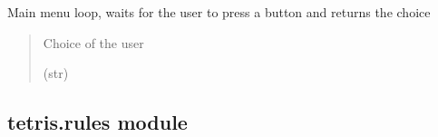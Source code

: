 \documentclass[letterpaper,10pt,english]{sphinxmanual}
\begin{document}
\begin{fulllineitems}
\begin{fulllineitems}
\end{fulllineitems}


\begin{fulllineitems}
\label{\detokenize{tetris.menu:tetris.menu.Menu.main}}
\pysigstartsignatures
{}
\pysigstopsignatures
\sphinxAtStartPar
Main menu loop, waits for the user to press a button and returns the choice
\begin{quote}\begin{description}
\sphinxAtStartPar
Choice of the user

\sphinxAtStartPar
(str)

\end{description}\end{quote}

\end{fulllineitems}


\end{fulllineitems}


\sphinxstepscope


\subsection{tetris.rules module}
\label{\detokenize{tetris.rules:module-tetris.rules}}\label{\detokenize{tetris.rules:tetris-rules-module}}\label{\detokenize{tetris.rules::doc}}
\end{document}

